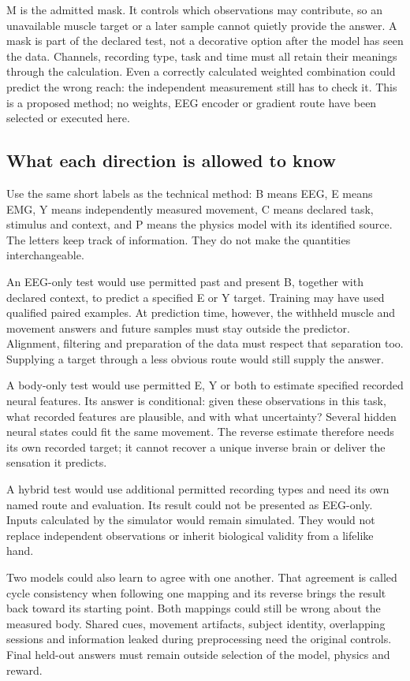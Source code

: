 M is the admitted mask. It controls which observations may contribute, so
an unavailable muscle target or a later sample cannot quietly provide the
answer. A mask is part of the declared test, not a decorative option after
the model has seen the data. Channels, recording type, task and time must all
retain their meanings through the calculation. Even a correctly calculated
weighted combination could predict the wrong reach: the independent
measurement still has to check it. This is a proposed method; no weights,
EEG encoder or gradient route have been selected or executed here.

\subsection{What each direction is allowed to know}

Use the same short labels as the technical method: B means EEG, E means
EMG, Y means independently measured movement, C means declared task,
stimulus and context, and P means the physics model with its identified
source. The letters keep track of information. They do not make the
quantities interchangeable.

An EEG-only test would use permitted past and present B, together with
declared context, to predict a specified E or Y target. Training may have
used qualified paired examples. At prediction time, however, the withheld
muscle and movement answers and future samples must stay outside the
predictor. Alignment, filtering and preparation of the data must respect
that separation too. Supplying a target through a less obvious route would
still supply the answer.

A body-only test would use permitted E, Y or both to estimate specified
recorded neural features. Its answer is conditional: given these observations
in this task, what recorded features are plausible, and with what uncertainty?
Several hidden neural states could fit the same movement. The reverse
estimate therefore needs its own recorded target; it cannot recover a unique
inverse brain or deliver the sensation it predicts.

A hybrid test would use additional permitted recording types and need its
own named route and evaluation. Its result could not be presented as EEG-only.
Inputs calculated by the simulator would remain simulated. They would not
replace independent observations or inherit biological validity from a
lifelike hand.

Two models could also learn to agree with one another. That agreement is
called cycle consistency when following one mapping and its reverse brings
the result back toward its starting point. Both mappings could still be
wrong about the measured body. Shared cues, movement artifacts, subject
identity, overlapping sessions and information leaked during preprocessing
need the original controls. Final held-out answers must remain outside
selection of the model, physics and reward.

